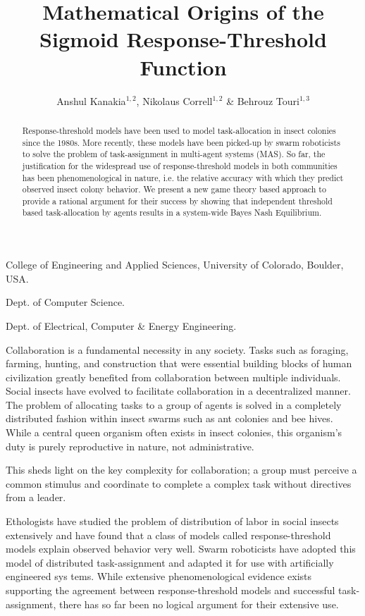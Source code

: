 \documentclass{nature}
\title{Mathematical Origins of the Sigmoid Response-Threshold Function}
\author{Anshul Kanakia$^{1,2}$, Nikolaus Correll$^{1,2}$ \& Behrouz Touri$^{1,3}$}
\begin{document}
\maketitle

\begin{affiliations}
 \item College of Engineering and Applied Sciences, University of Colorado, Boulder, USA. 
 \item Dept. of Computer Science.
 \item Dept. of Electrical, Computer \& Energy Engineering.
\end{affiliations}

\begin{abstract}
Response-threshold models have been used to model task-allocation in insect colonies since the 1980s. More recently, these models have been picked-up by swarm roboticists to solve the problem of task-assignment in multi-agent systems (MAS). So far, the justification for the  widespread use of response-threshold models in both communities has been phenomenological in nature, i.e. the relative accuracy with which they predict observed insect colony behavior. We present a new game theory based approach to provide a rational argument for their success by showing that independent threshold based task-allocation by agents results in a system-wide Bayes Nash Equilibrium.
\end{abstract}

Collaboration is a fundamental necessity in any society. Tasks such as foraging, farming, hunting, and construction that were essential building blocks of human civilization greatly benefited from collaboration between multiple individuals. Social insects have evolved to facilitate collaboration in a decentralized manner. The problem of allocating tasks to a group of agents is solved in a completely distributed fashion within insect swarms such as ant colonies and bee hives. While a central queen organism often exists in insect colonies, this organism's duty is purely reproductive in nature, not administrative.

This sheds light on the key complexity for collaboration; a group must perceive a common stimulus and coordinate to complete a complex task without directives from a leader. 

Ethologists have studied the problem of distribution of labor in social insects extensively and have found that a class of models called response-threshold models explain observed behavior very well. Swarm roboticists have adopted this model of distributed task-assignment and adapted it for use with artificially engineered sys tems. While extensive phenomenological evidence exists supporting the agreement between response-threshold models and successful task-assignment, there has so far been no logical argument for their extensive use. 
\end{document}
